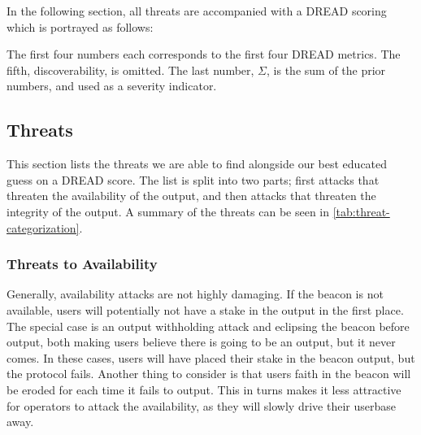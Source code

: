 In the following section, all threats are accompanied with a DREAD scoring which is portrayed as follows:
\vspace{\dimexpr-1\parsep-1\parskip\relax}%
\begin{center}
\end{center}
\vspace{\dimexpr-1\parsep-1\parskip\relax}%
The first four numbers each corresponds to the first four DREAD metrics.
The fifth, discoverability, is omitted.
The last number, $\Sigma$, is the sum of the prior numbers, and used as a severity indicator.

\subsection{Threats}
This section lists the threats we are able to find alongside our best educated guess on a DREAD score.
The list is split into two parts; first attacks that threaten the availability of the output, and then attacks that threaten the integrity of the output.
A summary of the threats can be seen in \vref{tab:threat-categorization}.

\subsubsection{Threats to Availability}
Generally, availability attacks are not highly damaging. If the beacon is not available, users will potentially not have a stake in the output in the first place. The special case is an output withholding attack and eclipsing the beacon before output, both making users believe there is going to be an output, but it never comes. In these cases, users will have placed their stake in the beacon output, but the protocol fails. Another thing to consider is that users faith in the beacon will be eroded for each time it fails to output. This in turns makes it less attractive for operators to attack the availability, as they will slowly drive their userbase away.

